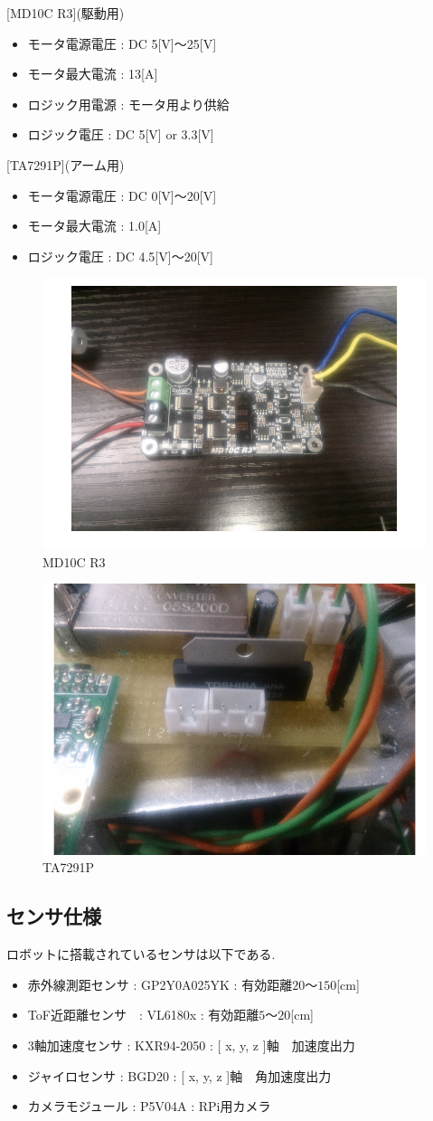 \documentclass[10pt,a4j]{ujarticle}
\begin{document}
[MD10C R3](駆動用)
\begin{itemize}
 \item モータ電源電圧 : DC 5[V]$〜$25[V]
 \item モータ最大電流 : 13[A]
 \item ロジック用電源 : モータ用より供給
 \item ロジック電圧   : DC 5[V] or 3.3[V]
\end{itemize}

[TA7291P](アーム用)
\begin{itemize}
 \item モータ電源電圧 : DC 0[V]$〜$20[V]
 \item モータ最大電流 : 1.0[A]
 \item ロジック電圧 : DC 4.5[V]$〜$20[V]
\end{itemize}
\begin{figure}[h]
 \centering
 \includegraphics[width=0.5\hsize]{./picture/MD10C.png}
    \caption{MD10C R3}
    \label{MD10C}
\end{figure}
\begin{figure}[h]
 \centering
 \includegraphics[width=0.5\hsize]{./picture/TO.png}
    \caption{TA7291P}
    \label{TA7291P}
\end{figure}

\newpage
\subsection{センサ仕様}
ロボットに搭載されているセンサは以下である.
\begin{itemize}
 \item 赤外線測距センサ : GP2Y0A025YK : 有効距離$20 〜 150$[cm]
 \item ToF近距離センサ　: VL6180x    : 有効距離$5 〜 20$[cm]
 \item 3軸加速度センサ : KXR94-2050 : [ x, y, z ]軸　加速度出力
 \item ジャイロセンサ : BGD20 : [ x, y, z ]軸　角加速度出力
 \item カメラモジュール : P5V04A : RPi用カメラ
\end{itemize}
\end{document}
